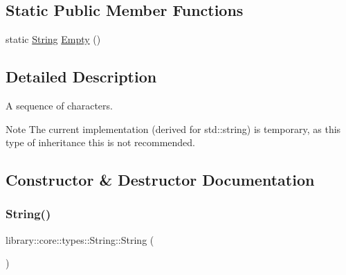 \subsection*{Static Public Member Functions}
\begin{DoxyCompactItemize}
\item 
static \hyperlink{classlibrary_1_1core_1_1types_1_1String}{String} \hyperlink{classlibrary_1_1core_1_1types_1_1String_a4d359cb0dba46e14ca46f90e728c2b96}{Empty} ()
\end{DoxyCompactItemize}


\subsection{Detailed Description}
A sequence of characters. 

\begin{DoxyNote}{Note}
The current implementation (derived for std\+::string) is temporary, as this type of inheritance this is not recommended. 
\end{DoxyNote}


\subsection{Constructor \& Destructor Documentation}
\mbox{\label{classlibrary_1_1core_1_1types_1_1String_ab49dec039a75f0049c95759141b6d484}} 
\subsubsection{\texorpdfstring{String()}{String()}\hspace{0.1cm}{\footnotesize\ttfamily [1/2]}}
{\footnotesize\ttfamily library\+::core\+::types\+::\+String\+::\+String (\begin{DoxyParamCaption}{ }\end{DoxyParamCaption})}

\mbox{\label{classlibrary_1_1core_1_1types_1_1String_a37c737528805786c49eab397ba7b64ae}} 
